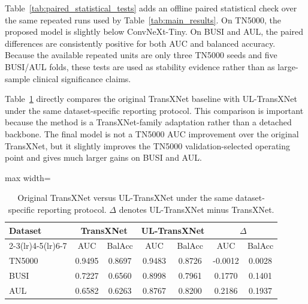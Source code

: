 Table~\ref{tab:paired_statistical_tests} adds an offline paired statistical check over the same repeated runs used by Table~\ref{tab:main_results}. On TN5000, the proposed model is slightly below ConvNeXt-Tiny. On BUSI and AUL, the paired differences are consistently positive for both AUC and balanced accuracy. Because the available repeated units are only three TN5000 seeds and five BUSI/AUL folds, these tests are used as stability evidence rather than as large-sample clinical significance claims.

Table~\ref{tab:original_transxnet_delta} directly compares the original TransXNet baseline with UL-TransXNet under the same dataset-specific reporting protocol. This comparison is important because the method is a TransXNet-family adaptation rather than a detached backbone. The final model is not a TN5000 AUC improvement over the original TransXNet, but it slightly improves the TN5000 validation-selected operating point and gives much larger gains on BUSI and AUL.

\begin{table}[t]
    \centering
    \small
    \caption{Original TransXNet versus UL-TransXNet under the same dataset-specific reporting protocol. $\Delta$ denotes UL-TransXNet minus TransXNet.}
    \label{tab:original_transxnet_delta}
    \begin{adjustbox}{max width=\columnwidth}
    \begin{tabular}{lcccccc}
        \toprule
        Dataset & \multicolumn{2}{c}{TransXNet} & \multicolumn{2}{c}{UL-TransXNet} & \multicolumn{2}{c}{$\Delta$} \\
        \cmidrule(lr){2-3}\cmidrule(lr){4-5}\cmidrule(lr){6-7}
        & AUC & BalAcc & AUC & BalAcc & AUC & BalAcc \\
        \midrule
        TN5000 & 0.9495 & 0.8697 & 0.9483 & 0.8726 & -0.0012 & 0.0028 \\
        BUSI & 0.7227 & 0.6560 & 0.8998 & 0.7961 & 0.1770 & 0.1401 \\
        AUL & 0.6582 & 0.6263 & 0.8767 & 0.8200 & 0.2186 & 0.1937 \\
        \bottomrule
    \end{tabular}
    \end{adjustbox}
\end{table}

